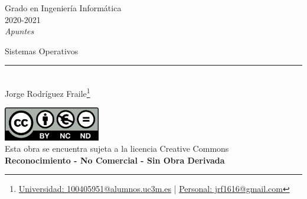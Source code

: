 \documentclass[12pt, twoside, openright]{report} %
\begin{document}
	
\begin{titlepage}
	\begin{sffamily}
	\color{azulUC3M}
	\begin{center}
		\begin{figure}[H] %
		\end{figure}
		\vspace{2.5cm}
		\begin{Large}
			Grado en Ingeniería Informática\\			
			2020-2021\\
			\vspace{2cm}		
			\textsl{Apuntes}\\
			\bigskip
		\end{Large}
		 	{\Huge Sistemas Operativos}\\
		 	\vspace*{0.5cm}
	 		\rule{10.5cm}{0.1mm}\\
			\vspace*{0.9cm}
			{\LARGE Jorge Rodríguez Fraile\footnote{\href{mailto:100405951@alumnos.uc3m.es}{Universidad: 100405951@alumnos.uc3m.es}  |  \href{mailto:jrf1616@gmail.com}{Personal: jrf1616@gmail.com}}}\\ 
			\vspace*{1cm}
	\end{center}
	\vfill
	\color{black}
		\includegraphics[width=4.2cm]{img/creativecommons.png}\\
		Esta obra se encuentra sujeta a la licencia Creative Commons\\ \textbf{Reconocimiento - No Comercial - Sin Obra Derivada}
	\end{sffamily}
\end{titlepage}


\tableofcontents
\thispagestyle{fancy}
\end{document}
